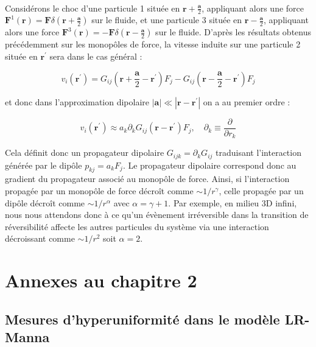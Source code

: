 \subparagraph{}Considérons le choc d'une particule 1 située en $\mathbf{r}+\frac{\mathbf{a}}{2}$, appliquant alors une force $\mathbf{F}^1(\mathbf{r})=\mathbf{F}\delta(\mathbf{r}+\frac{\mathbf{a}}{2})$ sur le fluide, et une particule 3 située en $\mathbf{r}-\frac{\mathbf{a}}{2}$, appliquant alors une force $\mathbf{F}^3(\mathbf{r})=-\mathbf{F}\delta(\mathbf{r}-\frac{\mathbf{a}}{2})$ sur le fluide. D'après les résultats obtenus précédemment sur les monopôles de force, la vitesse induite sur une particule 2 située en $\mathbf{r}^\prime$ sera dans le cas général :

\begin{equation}
	v_i (\mathbf{r}^\prime) = G_{ij}(\mathbf{r}+\frac{\mathbf{a}}{2} -\mathbf{r}^\prime)F_j - G_{ij}(\mathbf{r}-\frac{\mathbf{a}}{2} -\mathbf{r}^\prime)F_j
\end{equation}

\noindent et donc dans l'approximation dipolaire $|\mathbf{a}|\ll |\mathbf{r}-\mathbf{r}^\prime|$ on a au premier ordre :

\begin{equation}
	v_i (\mathbf{r}^\prime) \approx a_k\partial_k G_{ij}(\mathbf{r} -\mathbf{r}^\prime)F_j, \quad \partial_k \equiv \frac{\partial}{\partial r_k}
\end{equation}

\noindent Cela définit donc un propagateur dipolaire $G_{ijk} = \partial_kG_{ij}$ traduisant l'interaction générée par le dipôle $p_{kj} = a_kF_j$. Le propagateur dipolaire correspond donc au gradient du propagateur associé au monopôle de force. Ainsi, si l'interaction propagée par un monopôle de force décroît comme $\sim 1/r^\gamma$, celle propagée par un dipôle décroît comme $\sim 1/r^{\alpha}$ avec $\alpha = \gamma + 1$. Par exemple, en milieu 3D infini, nous nous attendons donc à ce qu'un évènement irréversible dans la transition de réversibilité affecte les autres particules du système via une interaction décroissant comme $\sim 1/r^2$ soit $\alpha = 2$.

\FloatBarrier

\chapter{Annexes au chapitre 2}

\section{Mesures d'hyperuniformité dans le modèle LR-Manna}

